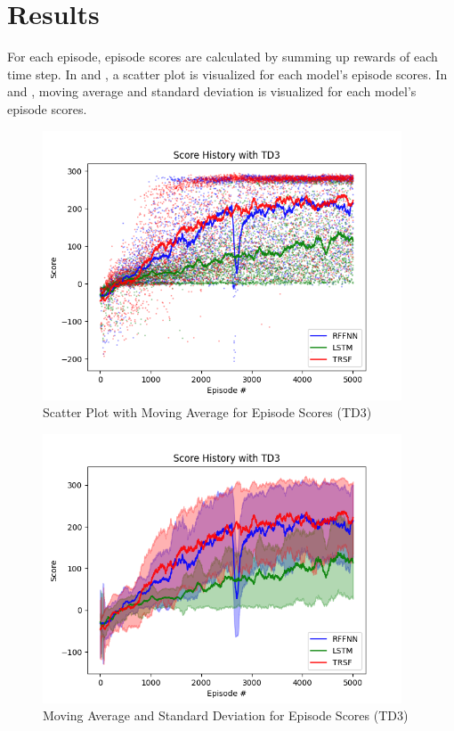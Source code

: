 \section{Results}

For each episode, episode scores are calculated by summing up rewards of each time step. 
In  and , a scatter plot is visualized for each model's episode scores. 
In  and , moving average and standard deviation is visualized for each model's episode scores. 

\begin{figure}[!ht]
	\centering
	\includegraphics[width=0.95\textwidth]{figures/bipedal/SCATTER_TD3_RFFNN_LSTM_TRSF.png}
	\caption{Scatter Plot with Moving Average for Episode Scores (TD3)}
	\label{fig:td3_scatter_ep_rewards}
\end{figure}
\begin{figure}[!ht]
	\centering
	\includegraphics[width=0.95\textwidth]{figures/bipedal/STD_TD3_RFFNN_LSTM_TRSF.png}
	\caption{Moving Average and Standard Deviation for Episode Scores (TD3)}
	\label{fig:td3_std_ep_rewards}
\end{figure} 

